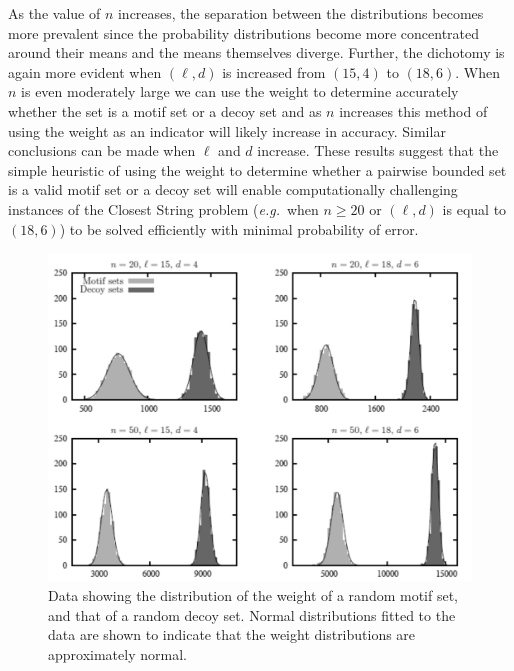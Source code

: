 As the value of $n$ increases, the separation between the distributions becomes more prevalent since the probability distributions become more concentrated around their means and the means themselves diverge.  Further, the dichotomy is again more evident when $(\ell, d)$ is increased from $(15, 4)$ to $(18, 6)$. When $n$ is even moderately large we can use the weight to determine accurately whether the set is a motif set or a decoy set and as $n$ increases this method of using the weight as an indicator will likely increase in accuracy.  Similar conclusions can be made when $\ell$ and $d$ increase. These results suggest that the simple heuristic of using the weight to determine whether a pairwise bounded set is a valid motif set or a decoy set will enable computationally challenging instances of the {\sc Closest String} problem ({\em e.g.}\ when $n \geq 20$ or $(\ell, d)$ is equal to $(18, 6)$) to be solved efficiently with minimal probability of error.


\begin{figure}[h!]
\begin{center} 
 \includegraphics[width=\linewidth]{images/temp2_b_w}
 \caption[Data showing the distribution of the weight of a random motif set, and that of a random decoy set.]{Data showing the distribution of the weight of a random motif set, and that of a random decoy set. Normal distributions fitted to the data are shown to indicate that the weight distributions are approximately normal.}
\label{fig:separation2}
\end{center}
\end{figure}

